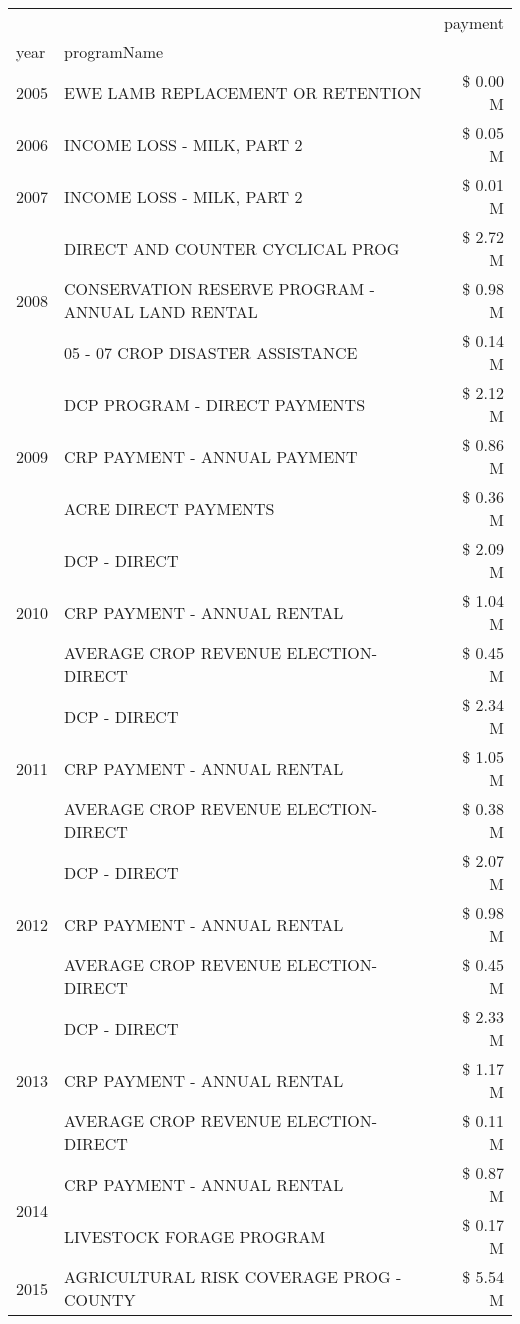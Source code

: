 \begin{tabular}{llr}
\toprule
 &  & payment \\
year & programName &  \\
\midrule
2005 & EWE LAMB REPLACEMENT OR RETENTION & \$ 0.00 M \\
\cline{1-3}
2006 & INCOME LOSS - MILK, PART 2 & \$ 0.05 M \\
\cline{1-3}
2007 & INCOME LOSS - MILK, PART 2 & \$ 0.01 M \\
\cline{1-3}
\multirow[t]{3}{*}{2008} & DIRECT AND COUNTER CYCLICAL PROG & \$ 2.72 M \\
 & CONSERVATION RESERVE PROGRAM - ANNUAL LAND RENTAL & \$ 0.98 M \\
 & 05 - 07 CROP DISASTER ASSISTANCE & \$ 0.14 M \\
\cline{1-3}
\multirow[t]{3}{*}{2009} & DCP PROGRAM - DIRECT PAYMENTS & \$ 2.12 M \\
 & CRP PAYMENT - ANNUAL PAYMENT & \$ 0.86 M \\
 & ACRE DIRECT PAYMENTS & \$ 0.36 M \\
\cline{1-3}
\multirow[t]{3}{*}{2010} & DCP - DIRECT & \$ 2.09 M \\
 & CRP PAYMENT - ANNUAL RENTAL & \$ 1.04 M \\
 & AVERAGE CROP REVENUE ELECTION-DIRECT & \$ 0.45 M \\
\cline{1-3}
\multirow[t]{3}{*}{2011} & DCP - DIRECT & \$ 2.34 M \\
 & CRP PAYMENT - ANNUAL RENTAL & \$ 1.05 M \\
 & AVERAGE CROP REVENUE ELECTION-DIRECT & \$ 0.38 M \\
\cline{1-3}
\multirow[t]{3}{*}{2012} & DCP - DIRECT & \$ 2.07 M \\
 & CRP PAYMENT - ANNUAL RENTAL & \$ 0.98 M \\
 & AVERAGE CROP REVENUE ELECTION-DIRECT & \$ 0.45 M \\
\cline{1-3}
\multirow[t]{3}{*}{2013} & DCP - DIRECT & \$ 2.33 M \\
 & CRP PAYMENT - ANNUAL RENTAL & \$ 1.17 M \\
 & AVERAGE CROP REVENUE ELECTION-DIRECT & \$ 0.11 M \\
\cline{1-3}
\multirow[t]{2}{*}{2014} & CRP PAYMENT - ANNUAL RENTAL & \$ 0.87 M \\
 & LIVESTOCK FORAGE PROGRAM & \$ 0.17 M \\
\cline{1-3}
\multirow[t]{3}{*}{2015} & AGRICULTURAL RISK COVERAGE PROG - COUNTY & \$ 5.54 M \\

\end{tabular}
